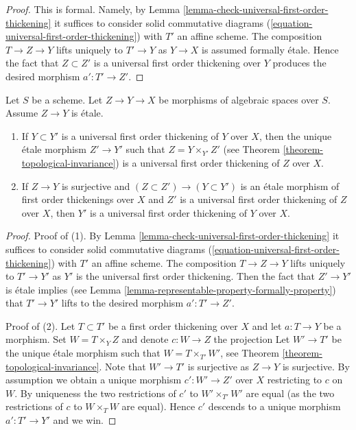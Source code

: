 \begin{proof}
This is formal. Namely, by
Lemma \ref{lemma-check-universal-first-order-thickening}
it suffices to consider solid commutative diagrams
(\ref{equation-universal-first-order-thickening})
with $T'$ an affine scheme. The composition
$T \to Z \to Y$ lifts uniquely to $T' \to Y$ as $Y \to X$ is
assumed formally \'etale. Hence the fact that
$Z \subset Z'$ is a universal first order thickening over $Y$
produces the desired morphism $a' : T' \to Z'$.
\end{proof}

\begin{lemma}
\label{lemma-etale-morphism-of-universal-thickenings}
Let $S$ be a scheme.
Let $Z \to Y \to X$ be morphisms of algebraic spaces over $S$.
Assume $Z \to Y$ is \'etale.
\begin{enumerate}
\item If $Y \subset Y'$ is a universal first order thickening of
$Y$ over $X$, then the unique \'etale morphism $Z' \to Y'$ such
that $Z = Y \times_{Y'} Z'$ (see
Theorem \ref{theorem-topological-invariance})
is a universal first order thickening of $Z$ over $X$.
\item If $Z \to Y$ is surjective and
$(Z \subset Z') \to (Y \subset Y')$ is an \'etale morphism
of first order thickenings over $X$ and $Z'$ is a universal first
order thickening of $Z$ over $X$, then $Y'$ is a universal first
order thickening of $Y$ over $X$.
\end{enumerate}
\end{lemma}

\begin{proof}
Proof of (1). By
Lemma \ref{lemma-check-universal-first-order-thickening}
it suffices to consider solid commutative diagrams
(\ref{equation-universal-first-order-thickening})
with $T'$ an affine scheme. The composition
$T \to Z \to Y$ lifts uniquely to $T' \to Y'$ as $Y'$ is
the universal first order thickening. Then the fact that
$Z' \to Y'$ is \'etale implies (see
Lemma \ref{lemma-representable-property-formally-property})
that $T' \to Y'$ lifts to the
desired morphism $a' : T' \to Z'$.

\medskip\noindent
Proof of (2). Let $T \subset T'$ be a first order thickening over
$X$ and let $a : T \to Y$ be a morphism. Set $W = T \times_Y Z$
and denote $c : W \to Z$ the projection
Let $W' \to T'$ be the unique \'etale morphism such that
$W = T \times_{T'} W'$, see
Theorem \ref{theorem-topological-invariance}.
Note that $W' \to T'$ is surjective as $Z \to Y$ is surjective.
By assumption we obtain a unique morphism $c' : W' \to Z'$
over $X$ restricting to $c$ on $W$. By uniqueness the two restrictions
of $c'$ to $W' \times_{T'} W'$ are equal (as the two restrictions of
$c$ to $W \times_T W$ are equal). Hence $c'$ descends to a unique
morphism $a' : T' \to Y'$ and we win.
\end{proof}

